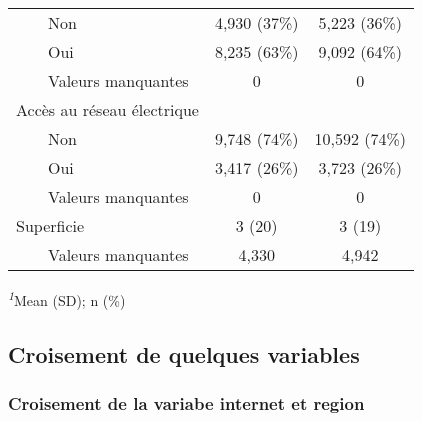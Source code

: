 \documentclass[
]{article}
\begin{document}
\begin{table}[!t]
\begin{tabular*}{\linewidth}{@{\extracolsep{\fill}}lcc}
    Non & 4,930 (37\%) & 5,223 (36\%) \\ 
    Oui & 8,235 (63\%) & 9,092 (64\%) \\ 
    Valeurs manquantes & 0 & 0 \\ 
Accès au réseau électrique &  &  \\ 
    Non & 9,748 (74\%) & 10,592 (74\%) \\ 
    Oui & 3,417 (26\%) & 3,723 (26\%) \\ 
    Valeurs manquantes & 0 & 0 \\ 
Superficie & 3 (20) & 3 (19) \\ 
    Valeurs manquantes & 4,330 & 4,942 \\ 
\bottomrule
\end{tabular*}
\begin{minipage}{\linewidth}
\textsuperscript{\textit{1}}Mean (SD); n (\%)\\
\end{minipage}
\end{table}

\subsection{Croisement de quelques
variables}\label{croisement-de-quelques-variables}

\subsubsection{Croisement de la variabe internet et
region}\label{croisement-de-la-variabe-internet-et-region}
\end{document}
